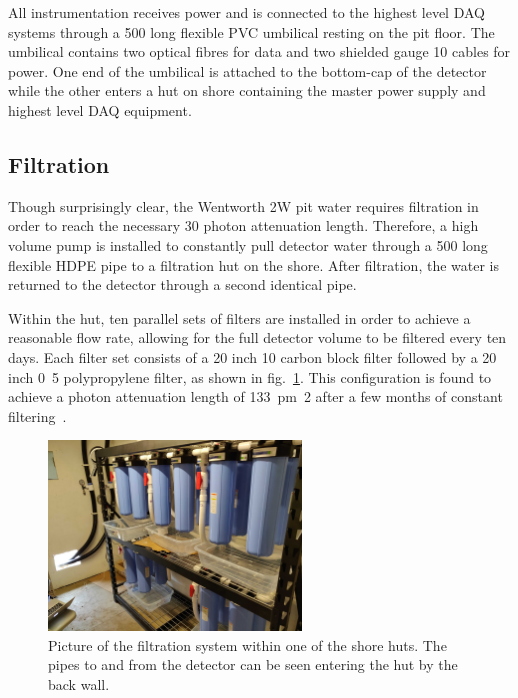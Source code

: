 All \chipsfive instrumentation receives power and is connected to the highest level DAQ systems
through a \unit{500}{} long flexible PVC umbilical resting on the pit floor. The
umbilical contains two optical fibres for data and two shielded gauge 10 cables for power. One end
of the umbilical is attached to the bottom-cap of the detector while the other enters a hut on
shore containing the master power supply and highest level DAQ equipment.

\subsection{Filtration} %
\label{sec:chips_detector_water} %

Though surprisingly clear, the Wentworth 2W pit water requires filtration in order to reach the
necessary \unit{30}{} photon attenuation length. Therefore, a high volume pump is
installed to constantly pull detector water through a \unit{500}{} long flexible HDPE
pipe to a filtration hut on the shore. After filtration, the water is returned to the detector
through a second identical pipe.

Within the hut, ten parallel sets of filters are installed in order to achieve a reasonable flow
rate, allowing for the full detector volume to be filtered every ten days. Each filter set
consists of a 20 inch \unit{10}{\mu{}} carbon block filter followed by a 20 inch
\unit{0.5}{\mu{}} polypropylene filter, as shown in fig.~\ref{fig:filtration}. This
configuration is found to achieve a photon attenuation length of \unit{133\pm2}{} after
a few months of constant filtering~\cite{campbell2020}.

\begin{figure} %
    \includegraphics[width=0.6\textwidth]{diagrams/4-chips/filtration.jpg}
    \caption[Picture of the \chipsfive filtration system]
    {Picture of the \chipsfive filtration system within one of the shore huts. The pipes to and
        from the detector can be seen entering the hut by the back wall.}
    \label{fig:filtration}
\end{figure}

